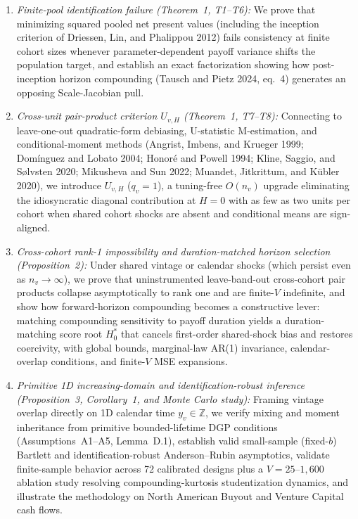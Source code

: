 \documentclass[11pt]{article}
\begin{document}
\begin{enumerate}[leftmargin=1.5em, itemsep=2pt, topsep=3pt]
  \item \emph{Finite-pool identification failure (Theorem~1, T1--T6):} We prove that minimizing squared pooled net present values (including the inception criterion of Driessen, Lin, and Phalippou 2012) fails consistency at finite cohort sizes whenever parameter-dependent payoff variance shifts the population target, and establish an exact factorization showing how post-inception horizon compounding (Tausch and Pietz 2024, eq.~4) generates an opposing Scale-Jacobian pull.
  \item \emph{Cross-unit pair-product criterion $U_{v,H}$ (Theorem~1, T7--T8):} Connecting to leave-one-out quadratic-form debiasing, U-statistic M-estimation, and conditional-moment methods (Angrist, Imbens, and Krueger 1999; Dom\'{i}nguez and Lobato 2004; Honor\'{e} and Powell 1994; Kline, Saggio, and S{\o}lvsten 2020; Mikusheva and Sun 2022; Muandet, Jitkrittum, and K\"{u}bler 2020), we introduce $U_{v,H}$ ($q_v = 1$), a tuning-free $O(n_v)$ upgrade eliminating the idiosyncratic diagonal contribution at $H=0$ with as few as two units per cohort when shared cohort shocks are absent and conditional means are sign-aligned.
  \item \emph{Cross-cohort rank-1 impossibility and duration-matched horizon selection (Proposition~2):} Under shared vintage or calendar shocks (which persist even as $n_v \to \infty$), we prove that uninstrumented leave-band-out cross-cohort pair products collapse asymptotically to rank one and are finite-$V$ indefinite, and show how forward-horizon compounding becomes a constructive lever: matching compounding sensitivity to payoff duration yields a duration-matching score root $H_0^\ast$ that cancels first-order shared-shock bias and restores coercivity, with global bounds, marginal-law AR(1) invariance, calendar-overlap conditions, and finite-$V$ MSE expansions.
  \item \emph{Primitive 1D increasing-domain and identification-robust inference (Proposition~3, Corollary~1, and Monte Carlo study):} Framing vintage overlap directly on 1D calendar time $y_v \in \mathbb{Z}$, we verify mixing and moment inheritance from primitive bounded-lifetime DGP conditions (Assumptions~A1--A5, Lemma~D.1), establish valid small-sample (fixed-$b$) Bartlett and identification-robust Anderson--Rubin asymptotics, validate finite-sample behavior across 72 calibrated designs plus a $V = 25\text{--}1{,}600$ ablation study resolving compounding-kurtosis studentization dynamics, and illustrate the methodology on North American Buyout and Venture Capital cash flows.
\end{enumerate}
\end{document}
